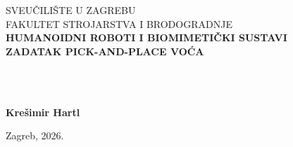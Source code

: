 \documentclass[12pt,a4paper]{article}
\begin{document}
\begin{titlepage}
    \thispagestyle{empty}
    \centering
    {\fontsize{16pt}{19pt}\selectfont SVEUČILIŠTE U ZAGREBU\\}
    {\fontsize{16pt}{19pt}\selectfont FAKULTET STROJARSTVA I BRODOGRADNJE\\}
    \vfill
    {\fontsize{28pt}{34pt}\selectfont\bfseries HUMANOIDNI ROBOTI I BIOMIMETIČKI SUSTAVI\\}
    \vspace{0.5cm}
    {\fontsize{28pt}{34pt}\selectfont\bfseries ZADATAK PICK-AND-PLACE VOĆA\\}
    \vfill
    \noindent
    \begin{minipage}[t]{0.48\textwidth}
        \raggedright
        {\fontsize{14pt}{17pt}\selectfont \ \\}
        {\fontsize{14pt}{17pt}\selectfont \ \\}
    \end{minipage}
    \hfill
    \begin{minipage}[t]{0.48\textwidth}
        \raggedleft
        {\fontsize{14pt}{17pt}\selectfont\bfseries Krešimir Hartl\\}
    \end{minipage}
    \vspace{1cm}
    \begin{center}
        {\fontsize{14pt}{17pt}\selectfont Zagreb, 2026.}
    \end{center}
\end{titlepage}


\tableofcontents
\newpage
\listoffigures
\newpage

\end{document}
